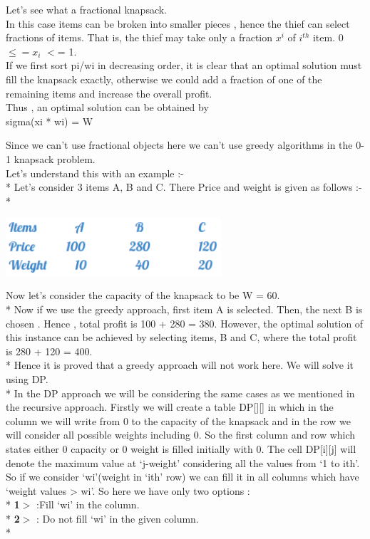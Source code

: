 \documentclass[12pt]{book}
\begin{document}
Let’s see what a fractional knapsack.\\
In this case items can be broken into smaller pieces , hence the thief can select fractions of items. That is, the thief may take only a fraction $x^i$ of $i^{th}$ item. 
0 $\leq= x_i$ $<$= 1.\\
\newline
If we first sort pi/wi in decreasing order, it is clear that an optimal solution must fill the knapsack exactly, otherwise we could add a fraction of one of the remaining items and increase the overall profit.\\
\newline
Thus , an optimal solution can be obtained by\\
    sigma(xi * wi) = W
    
Since we can’t use fractional objects here we can’t use greedy algorithms in the 0-1 knapsack problem.\\
\newline
Let’s understand this with an example :-\\*
Let’s consider 3 items A, B and C. There Price and weight is given as follows :-\\*

\begin{center}
    \includegraphics[width =8cm]{71GurBu.png}    
\end{center}
Now let’s consider the capacity of the knapsack to be W = 60.\\*
\newline
Now if we use the greedy approach, first item A is selected. Then, the next B is chosen . Hence , total profit is 100 + 280 = 380. However, the optimal solution of this instance can be achieved by selecting items, B and C, where the total profit is 280 + 120 = 400.\\*
Hence it is proved that a greedy approach will not work here. We will solve it using DP.\\*
\newline
In the DP approach we will be considering the same cases as we mentioned in the recursive approach. Firstly we will create a table DP[][] in which in the column we will write from 0 to the capacity of the knapsack and in the row we will consider all possible weights including 0. So the first column and row which states either 0 capacity or 0 weight is filled initially with 0. The cell DP[i][j] will denote the maximum value at ‘j-weight’ considering all the values from ‘1 to ith’. So if we consider ‘wi’(weight in ‘ith’ row) we can fill it in all columns which have ‘weight values > wi’. So here we have only two options :\\*
\textbf{1$>$} :Fill ‘wi’ in the column.\\*
\textbf{2$>$} : Do not fill ‘wi’ in the given column.\\*
\end{document}
